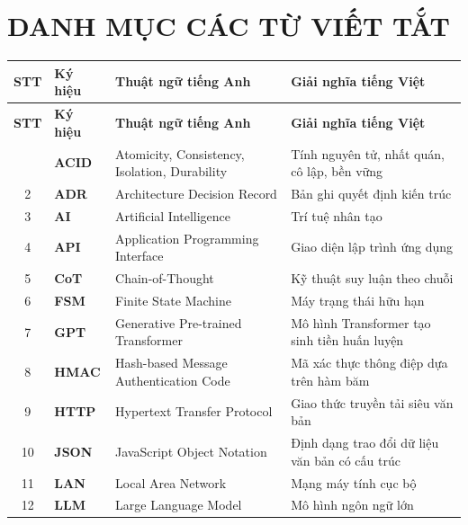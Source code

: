 \newpage
\chapter*{DANH MỤC CÁC TỪ VIẾT TẮT}

{\small
\begin{longtable}{c l p{5.5cm} p{5.8cm}}
\toprule
\textbf{STT} & \textbf{Ký hiệu} & \textbf{Thuật ngữ tiếng Anh} & \textbf{Giải nghĩa tiếng Việt} \\
\midrule
\endfirsthead
\toprule
\textbf{STT} & \textbf{Ký hiệu} & \textbf{Thuật ngữ tiếng Anh} & \textbf{Giải nghĩa tiếng Việt} \\
\midrule
\endhead
\bottomrule
\endfoot
1  & \textbf{ACID}    & Atomicity, Consistency, Isolation, Durability & Tính nguyên tử, nhất quán, cô lập, bền vững \\
2  & \textbf{ADR}     & Architecture Decision Record                  & Bản ghi quyết định kiến trúc \\
3  & \textbf{AI}      & Artificial Intelligence                       & Trí tuệ nhân tạo \\
4  & \textbf{API}     & Application Programming Interface             & Giao diện lập trình ứng dụng \\
5  & \textbf{CoT}     & Chain-of-Thought                              & Kỹ thuật suy luận theo chuỗi \\
6  & \textbf{FSM}     & Finite State Machine                          & Máy trạng thái hữu hạn \\
7  & \textbf{GPT}     & Generative Pre-trained Transformer            & Mô hình Transformer tạo sinh tiền huấn luyện \\
8  & \textbf{HMAC}    & Hash-based Message Authentication Code        & Mã xác thực thông điệp dựa trên hàm băm \\
9  & \textbf{HTTP}    & Hypertext Transfer Protocol                   & Giao thức truyền tải siêu văn bản \\
10 & \textbf{JSON}    & JavaScript Object Notation                    & Định dạng trao đổi dữ liệu văn bản có cấu trúc \\
11 & \textbf{LAN}     & Local Area Network                            & Mạng máy tính cục bộ \\
12 & \textbf{LLM}     & Large Language Model                          & Mô hình ngôn ngữ lớn \\

\end{longtable}}
